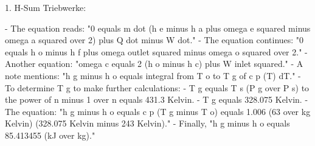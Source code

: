 1. H-Sum Triebwerke:

- The equation reads: "0 equals m dot (h e minus h a plus omega e squared minus omega a squared over 2) plus Q dot minus W dot."
- The equation continues: "0 equals h o minus h f plus omega outlet squared minus omega o squared over 2."
- Another equation: "omega c equals 2 (h o minus h c) plus W inlet squared."
- A note mentions: "h g minus h o equals integral from T o to T g of c p (T) dT."
- To determine T g to make further calculations: 
  - T g equals T s (P g over P s) to the power of n minus 1 over n equals 431.3 Kelvin.
  - T g equals 328.075 Kelvin.
- The equation: "h g minus h o equals c p (T g minus T o) equals 1.006 (63 over kg Kelvin) (328.075 Kelvin minus 243 Kelvin)."
- Finally, "h g minus h o equals 85.413455 (kJ over kg)."